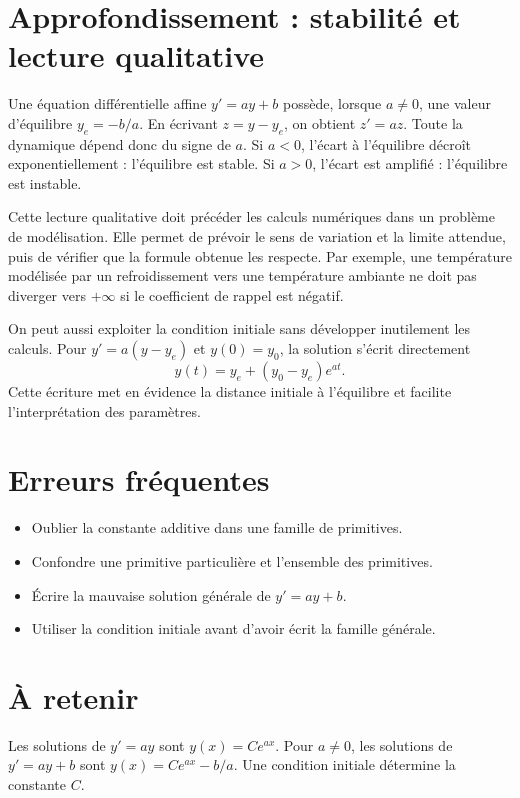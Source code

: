 \section{Approfondissement : stabilité et lecture qualitative}
Une équation différentielle affine $y'=ay+b$ possède, lorsque $a\neq0$, une valeur d’équilibre $y_e=-b/a$. En écrivant $z=y-y_e$, on obtient $z'=az$. Toute la dynamique dépend donc du signe de $a$. Si $a<0$, l’écart à l’équilibre décroît exponentiellement : l’équilibre est stable. Si $a>0$, l’écart est amplifié : l’équilibre est instable.

Cette lecture qualitative doit précéder les calculs numériques dans un problème de modélisation. Elle permet de prévoir le sens de variation et la limite attendue, puis de vérifier que la formule obtenue les respecte. Par exemple, une température modélisée par un refroidissement vers une température ambiante ne doit pas diverger vers $+\infty$ si le coefficient de rappel est négatif.

On peut aussi exploiter la condition initiale sans développer inutilement les calculs. Pour $y'=a(y-y_e)$ et $y(0)=y_0$, la solution s’écrit directement
\[
y(t)=y_e+(y_0-y_e)e^{at}.
\]
Cette écriture met en évidence la distance initiale à l’équilibre et facilite l’interprétation des paramètres.

\section{Erreurs fréquentes}
\begin{itemize}
\item Oublier la constante additive dans une famille de primitives.
\item Confondre une primitive particulière et l’ensemble des primitives.
\item Écrire la mauvaise solution générale de $y'=ay+b$.
\item Utiliser la condition initiale avant d’avoir écrit la famille générale.
\end{itemize}

\section{À retenir}
\begin{aretenir}
Les solutions de $y'=ay$ sont $y(x)=Ce^{ax}$. Pour $a\neq0$, les solutions de $y'=ay+b$ sont $y(x)=Ce^{ax}-b/a$. Une condition initiale détermine la constante $C$.
\end{aretenir}
